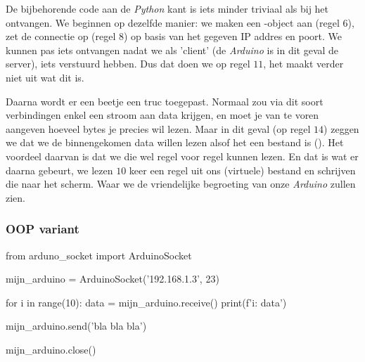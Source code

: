 \newpage 

De bijbehorende code aan de \textit{Python} kant is iets minder triviaal als bij het ontvangen. 
We beginnen op dezelfde manier: we maken een -object aan (regel $6$), zet de connectie op (regel $8$) op basis van het gegeven IP addres en poort. We kunnen pas iets ontvangen nadat we als 'client' (de \textit{Arduino} is in dit geval de server), iets verstuurd hebben. Dus dat doen we op regel $11$, het maakt verder niet uit wat dit is. \newline

Daarna wordt er een beetje een truc toegepast. Normaal zou via dit soort verbindingen enkel een stroom aan data krijgen, en moet je van te voren aangeven hoeveel bytes je precies wil lezen. Maar in dit geval (op regel $14$) zeggen we dat we de binnengekomen data willen lezen alsof het een bestand is (). Het voordeel daarvan is dat we die wel regel voor regel kunnen lezen. 
En dat is wat er daarna gebeurt, we lezen $10$ keer een regel uit ons (virtuele) bestand  en schrijven die naar het scherm. Waar we de vriendelijke begroeting van onze \textit{Arduino} zullen zien. 

\subsubsection{OOP variant}


\begin{python}
from arduno_socket import ArduinoSocket

mijn_arduino = ArduinoSocket('192.168.1.3', 23)

for i in range(10):
    data = mijn_arduino.receive()
    print(f'{i}: {data}')

mijn_arduino.send('bla bla bla')

mijn_arduino.close()
\end{python}


%


